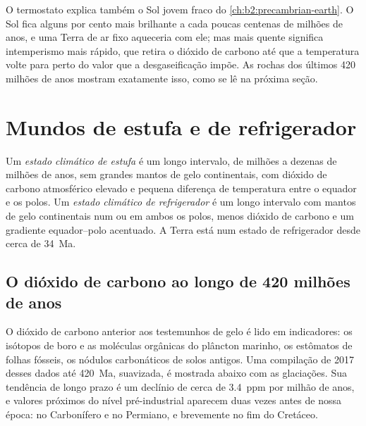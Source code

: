 O termostato explica também o Sol jovem fraco do \cref{ch:b2:precambrian-earth}. O Sol fica alguns por cento
mais brilhante a cada poucas centenas de milhões de anos, e uma Terra de ar fixo aqueceria com ele;
mas mais quente significa intemperismo mais rápido, que retira o dióxido de carbono até que a temperatura
volte para perto do valor que a desgaseificação impõe. As rochas dos últimos 420 milhões de anos mostram exatamente
isso, como se lê na próxima seção.

\section{Mundos de estufa e de refrigerador}\label{sec:b2:deep-time-climate:states}

\begin{definition}\label{def:b2:deep-time-climate:states}
Um \emph{estado climático de estufa} é um longo intervalo, de milhões a
dezenas de milhões de anos, sem grandes mantos de gelo continentais, com dióxido de carbono atmosférico
elevado e pequena diferença de temperatura entre o equador e os polos. Um \emph{estado climático
de refrigerador} é um longo intervalo com mantos de gelo continentais num
ou em ambos os polos, menos dióxido de carbono e um gradiente equador--polo acentuado. A Terra está num
estado de refrigerador desde cerca de \qty{34}{Ma}.
\end{definition}

\subsection*{O dióxido de carbono ao longo de 420 milhões de anos}

O dióxido de carbono anterior aos testemunhos de gelo é lido em indicadores: os isótopos de boro e as moléculas orgânicas
do plâncton marinho, os estômatos de folhas fósseis, os nódulos carbonáticos de solos antigos. Uma
compilação de 2017 desses dados até \qty{420}{Ma}, suavizada, é mostrada abaixo com as glaciações. Sua
tendência de longo prazo é um declínio de cerca de \qty{3.4}{ppm} por milhão de anos, e valores próximos do
nível pré-industrial aparecem duas vezes antes de nossa época: no Carbonífero e no Permiano, e
brevemente no fim do Cretáceo.

